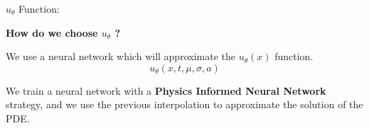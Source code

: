 \begin{frame}{$u_{\theta}$ Function:}

    \textbf{How do we choose $u_{\theta}$ ?}
    
    We use a neural network which will approximate the $u_\theta(x)$ function. 
    $$
    u_{\theta}(x ,t, \mu, \sigma, a)
    $$


    We train a neural network with a \textbf{Physics Informed Neural Network} strategy, and we use the previous interpolation to approximate
    the solution of the PDE.

\end{frame}
